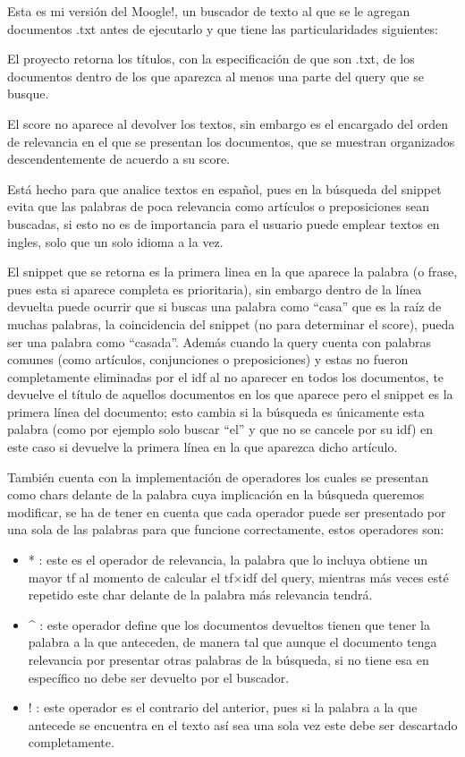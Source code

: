 \documentclass[a4paper,12pt,]{article}
\begin{document}
Esta es mi versión del Moogle!, un buscador de texto al que se le agregan documentos .txt antes de 
ejecutarlo y que tiene las particularidades siguientes: 

El proyecto retorna los títulos, con la especificación de que son .txt, de los documentos dentro de los que 
aparezca al menos una parte del query que se busque. 

El score no aparece al devolver los textos, sin embargo es el encargado del orden de relevancia en el que se 
presentan los documentos, que se muestran organizados descendentemente de acuerdo a su score.

Está hecho para que analice textos en español, pues en la búsqueda del snippet evita que las palabras de poca 
relevancia como artículos o preposiciones sean buscadas, si esto no es de importancia para el usuario puede 
emplear textos en ingles, solo que un solo idioma a la vez.

El snippet que se retorna es la primera linea en la que aparece la palabra (o frase, pues esta si aparece 
completa es prioritaria), sin embargo dentro de la línea devuelta puede ocurrir que si buscas una palabra 
como “casa” que es la raíz de muchas palabras, la coincidencia del snippet (no para determinar el score), 
pueda ser una palabra como “casada”. Además cuando la query cuenta con palabras comunes (como artículos, 
conjunciones o preposiciones) y estas no fueron completamente eliminadas por el idf al no aparecer en todos 
los documentos, te devuelve el título de aquellos documentos en los que aparece pero el snippet es la primera 
línea del documento; esto cambia si la búsqueda es únicamente esta palabra (como por ejemplo solo buscar “el” 
y que no se cancele por su idf) en este caso si devuelve la primera línea en la que aparezca dicho artículo.

También cuenta con la implementación de operadores los cuales se presentan como chars delante de la palabra 
cuya implicación en la búsqueda queremos modificar, se ha de tener en cuenta que cada operador puede ser 
presentado por una sola de las palabras para que funcione correctamente, estos operadores son:

\begin{itemize}
    \item * : este es el operador de relevancia, la palabra que lo incluya obtiene un mayor tf al momento 
    de calcular el tf$\times $idf del query, mientras más veces esté repetido este char delante de la palabra 
    más relevancia tendrá.
    
    \item \^{} : este operador define que los documentos devueltos tienen que tener la palabra a la que 
    anteceden, de manera tal que aunque el documento tenga relevancia por presentar otras palabras de la 
    búsqueda, si no tiene esa en específico no debe ser devuelto por el buscador.

    \item ! : este operador es el contrario del anterior, pues si la palabra a la que antecede se encuentra 
    en el texto así sea una sola vez este debe ser descartado completamente.

\end{itemize}
\end{document}
